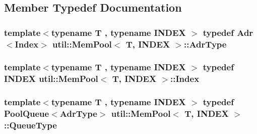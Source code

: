 \subsection{Member Typedef Documentation}
\hypertarget{structutil_1_1MemPool_ace5e7994507896fbdb4e188e3886e73d}{
\subsubsection[{Adr\-Type}]{\setlength{\rightskip}{0pt plus 5cm}template$<$typename T , typename I\-N\-D\-E\-X $>$ typedef {\bf Adr}$<${\bf Index}$>$ {\bf util\-::\-Mem\-Pool}$<$ T, I\-N\-D\-E\-X $>$\-::{\bf Adr\-Type}}}\label{structutil_1_1MemPool_ace5e7994507896fbdb4e188e3886e73d}
\hypertarget{structutil_1_1MemPool_abad76ce984ee05501d88426b5641e5c2}{
\subsubsection[{Index}]{\setlength{\rightskip}{0pt plus 5cm}template$<$typename T , typename I\-N\-D\-E\-X $>$ typedef I\-N\-D\-E\-X {\bf util\-::\-Mem\-Pool}$<$ T, I\-N\-D\-E\-X $>$\-::{\bf Index}}}\label{structutil_1_1MemPool_abad76ce984ee05501d88426b5641e5c2}
\hypertarget{structutil_1_1MemPool_a354adf83f470881d3839a19f9589aad9}{
\subsubsection[{Queue\-Type}]{\setlength{\rightskip}{0pt plus 5cm}template$<$typename T , typename I\-N\-D\-E\-X $>$ typedef {\bf Pool\-Queue}$<${\bf Adr\-Type}$>$ {\bf util\-::\-Mem\-Pool}$<$ T, I\-N\-D\-E\-X $>$\-::{\bf Queue\-Type}}}\label{structutil_1_1MemPool_a354adf83f470881d3839a19f9589aad9}


